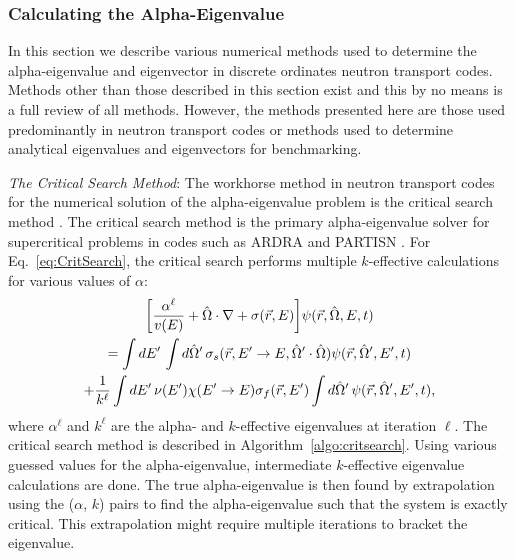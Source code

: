\subsubsection{Calculating the Alpha-Eigenvalue}
\label{sec:CalcAlpha}

In this section we describe various numerical methods used to determine the alpha-eigenvalue and eigenvector in discrete ordinates neutron transport codes. 
Methods other than those described in this section exist and this by no means is a full review of all methods. However, the methods presented here are those used predominantly in neutron transport codes or methods used to determine analytical eigenvalues and eigenvectors for benchmarking.

\textit{The Critical Search Method}: The workhorse method in neutron transport codes for the numerical solution of the alpha-eigenvalue problem is the critical search method \cite{hill_efficient_1983}. The critical search method is the primary alpha-eigenvalue solver for supercritical problems in codes such as ARDRA \cite{hanebutte_ardra_1999} and PARTISN \cite{alcouffe2005partisn}. For Eq.~\ref{eq:CritSearch}, the critical search performs multiple $k$-effective calculations for various values of $\alpha$:
\begin{multline}
	\bigg [ \frac{\alpha^{\ell}}{v(E)}  + \hat{\Omega} \cdot \nabla + \sigma(\vec{r},E) \bigg ] \psi(\vec{r},\hat{\Omega},E,t) \\ = \int \mathop{}\!d E' \, \int \mathop{}\!d \hat{\Omega}' \, \sigma_{s}(\vec{r},E'\rightarrow E,\hat{\Omega}' \cdot \hat{\Omega}) \psi(\vec{r},\hat{\Omega}',E',t) \\ + \frac{1}{k^{\ell}}\int \mathop{}\!d E' \, \nu(E') \chi(E'\rightarrow E) \sigma_{f}(\vec{r},E') \int \mathop{}\!d \hat{\Omega}' \, \psi(\vec{r},\hat{\Omega}',E',t), 
	\label{eq:CritSearch}
\end{multline}
where $\alpha^{\ell}$ and $k^{\ell}$ are the alpha- and $k$-effective eigenvalues at iteration $\ell$.
The critical search method is described in Algorithm~\ref{algo:critsearch}. Using various guessed values for the alpha-eigenvalue, intermediate $k$-effective eigenvalue calculations are done. The true alpha-eigenvalue is then found by extrapolation using the ($\alpha$, $k$) pairs to find the alpha-eigenvalue such that the system is exactly critical. This extrapolation might require multiple iterations to bracket the eigenvalue. 

